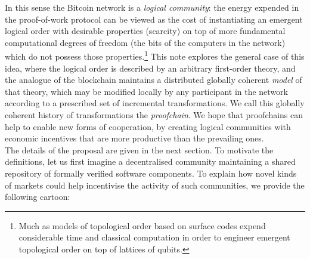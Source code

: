 \documentclass[english,letter paper,12pt,reqno]{article}
\theoremstyle{example}
\begin{document}
In this sense the Bitcoin network is a \emph{logical community}: the energy expended in the proof-of-work protocol can be viewed as the cost of instantiating an emergent logical order with desirable properties (scarcity) on top of more fundamental computational degrees of freedom (the bits of the computers in the network) which do not possess those properties.\footnote{Much as models of topological order based on surface codes \cite{kitaev} expend considerable time and classical computation in order to engineer emergent topological order on top of lattices of qubits.} This note explores the general case of this idea, where the logical order is described by an arbitrary first-order theory, and the analogue of the blockchain maintains a distributed globally coherent \emph{model} of that theory, which may be modified locally by any participant in the network according to a prescribed set of incremental transformations. We call this globally coherent history of transformations the \emph{proofchain}. We hope that proofchains can help to enable new forms of cooperation, by creating logical communities with economic incentives that are more productive than the prevailing ones. 
\\

The details of the proposal are given in the next section. To motivate the definitions, let us first imagine a decentralised community maintaining a shared repository of formally verified software components. To explain how novel kinds of markets could help incentivise the activity of such communities, we provide the following cartoon:
\end{document}
